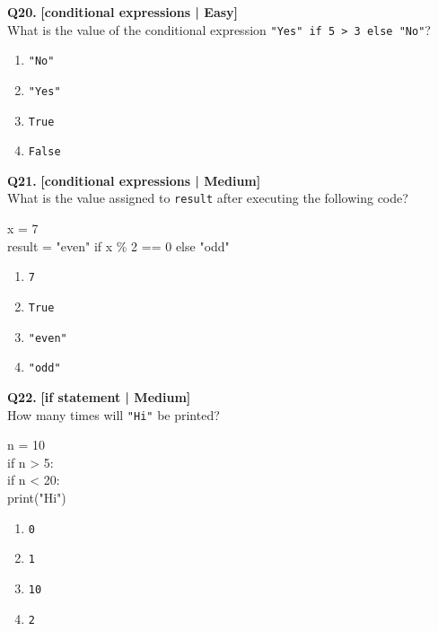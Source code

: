 \noindent\textbf{Q20.} \hfill {\small\color{LPUOrange}\textbf{[conditional expressions | Easy]}}\\[2pt]
What is the value of the conditional expression \texttt{"Yes" if 5 > 3 else "No"}?

\begin{enumerate}[label=(\alph*),topsep=2pt,itemsep=1pt,partopsep=0pt,parsep=0pt]
    \item \relax \texttt{"No"}
    \item \relax \texttt{"Yes"}
    \item \relax \texttt{True}
    \item \relax \texttt{False}
\end{enumerate}
\vspace{2mm}

\noindent\textbf{Q21.} \hfill {\small\color{LPUOrange}\textbf{[conditional expressions | Medium]}}\\[2pt]
What is the value assigned to \texttt{result} after executing the following code? 

\begin{pycode}
x = 7\\
result = "even" if x \% 2 == 0 else "odd"
\end{pycode}

\begin{enumerate}[label=(\alph*),topsep=2pt,itemsep=1pt,partopsep=0pt,parsep=0pt]
    \item \relax \texttt{7}
    \item \relax \texttt{True}
    \item \relax \texttt{"even"}
    \item \relax \texttt{"odd"}
\end{enumerate}
\vspace{2mm}

\noindent\textbf{Q22.} \hfill {\small\color{LPUOrange}\textbf{[if statement | Medium]}}\\[2pt]
How many times will \texttt{"Hi"} be printed? 

\begin{pycode}
n = 10\\
if n > 5:\\
if n < 20:\\
print("Hi")
\end{pycode}

\begin{enumerate}[label=(\alph*),topsep=2pt,itemsep=1pt,partopsep=0pt,parsep=0pt]
    \item \relax \texttt{0}
    \item \relax \texttt{1}
    \item \relax \texttt{10}
    \item \relax \texttt{2}
\end{enumerate}
\vspace{2mm}

